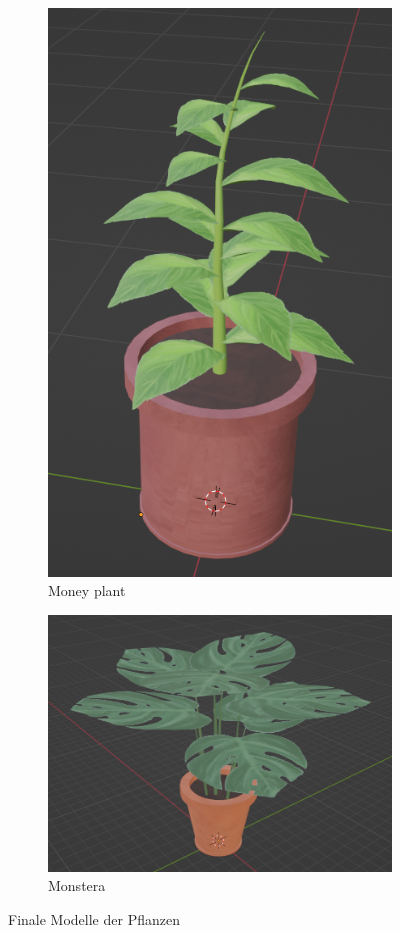 \begin{figure}[H]
	\begin{subfigure}{0.5\textwidth}
		\centering
		\includegraphics[height=0.3\pageheight,keepaspectratio]{pics/11}
		\caption{Money plant}
	\end{subfigure}
	\begin{subfigure}{0.5\textwidth}
		\centering
		\includegraphics[height=0.3\pageheight,keepaspectratio]{pics/12}
		\caption{Monstera}
	\end{subfigure}
	\caption{Finale Modelle der Pflanzen}
\end{figure}
